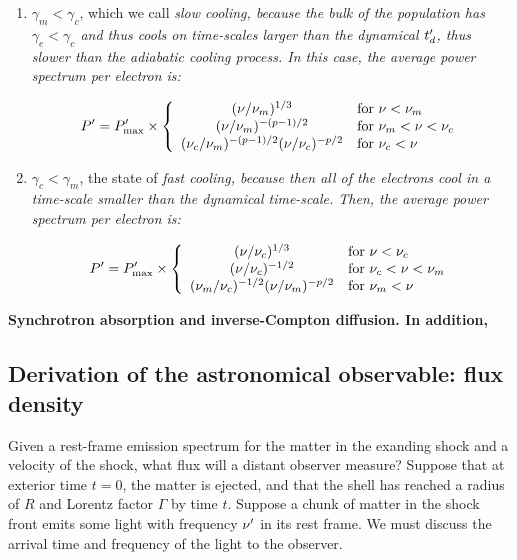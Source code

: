 \begin{enumerate}
    \item $\gamma_m < \gamma_c$, which we call \it{slow cooling}, because the bulk of the population has $\gamma_e < \gamma_c$ and thus cools on time-scales larger than the dynamical $t_d^{\prime}$, thus slower than the adiabatic cooling process. In this case, the average power spectrum per electron is:

    \begin{equation}
        P^{\prime} = P_{\mathrm{max}}^{\prime} \times \left\{ \begin{array}{cl}
                         (\nu/\nu_m)^{1/3} & \text{for } \nu < \nu_m \\
                         (\nu/\nu_m)^{-(p-1)/2} & \text{for }  \nu_m < \nu < \nu_c \\
                         (\nu_c/\nu_m)^{-(p-1)/2}(\nu/\nu_c)^{-p/2} & \text{for }  \nu_c < \nu
                         \end{array}\right.
    \end{equation}

    \item $\gamma_c < \gamma_m$, the state of \it{fast cooling}, because then all of the electrons cool in a time-scale smaller than the dynamical time-scale. Then, the average power spectrum per electron is:

    \begin{equation}
        P^{\prime} = P_{\mathrm{max}}^{\prime} \times \left\{ \begin{array}{cl}
            (\nu/\nu_c)^{1/3} & \text{for }  \nu < \nu_c \\
            (\nu/\nu_c)^{-1/2} & \text{for }  \nu_c < \nu < \nu_m \\
            (\nu_m/\nu_c)^{-1/2}(\nu/\nu_m)^{-p/2} & \text{for }  \nu_m < \nu
                         \end{array}\right.
    \end{equation}
\end{enumerate}

\bf{Synchrotron absorption and inverse-Compton diffusion.} In addition,
\subsection{Derivation of the astronomical observable: flux density}

Given a rest-frame emission spectrum for the matter in the exanding shock and a velocity of the shock, what flux will a distant observer measure? Suppose that at exterior time $t = 0$, the matter is ejected, and that the shell has reached a radius of $R$ and Lorentz factor $\Gamma$ by time $t$. Suppose a chunk of matter in the shock front emits some light with frequency $\nu^{\prime}$ in its rest frame. We must discuss the arrival time and frequency of the light to the observer.

